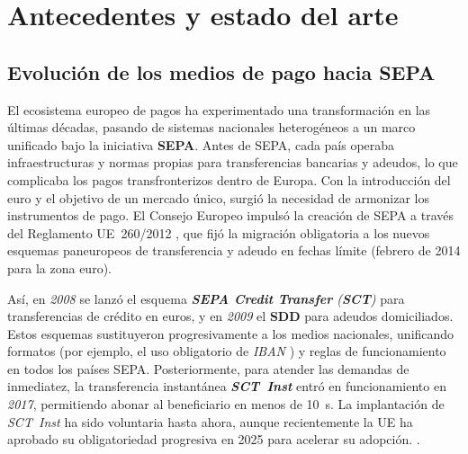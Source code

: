 
\chapter{Antecedentes y estado del arte}
\label{sec:estado-arte}

\section{Evolución de los medios de pago hacia SEPA}
\label{subsec:evolucion-sepa}


El ecosistema europeo de pagos ha experimentado una transformación en las últimas décadas, pasando de sistemas nacionales heterogéneos a un marco unificado bajo la iniciativa \textbf{SEPA}. Antes de SEPA, cada país operaba infraestructuras y normas propias para transferencias bancarias y adeudos, lo que complicaba los pagos transfronterizos dentro de Europa.  
Con la introducción del euro y el objetivo de un mercado único, surgió la necesidad de armonizar los instrumentos de pago. El Consejo Europeo impulsó la creación de SEPA a través del Reglamento UE~\num{260}/\num{2012} \cite{eu_260_2012}, que fijó la migración obligatoria a los nuevos esquemas paneuropeos de transferencia y adeudo en fechas límite (febrero de 2014 para la zona euro).  
\vspace{0.5cm}

Así, en \textit{2008} se lanzó el esquema \textit{\textbf{SEPA Credit Transfer} (\textbf{SCT})} \cite{epc125_2023} para transferencias de crédito en euros, y en \textit{2009} el \textbf{SDD} para adeudos domiciliados. Estos esquemas sustituyeron progresivamente a los medios nacionales, unificando formatos (por ejemplo, el uso obligatorio de \emph{IBAN} \cite{EU_IBAN_2001}) y reglas de funcionamiento en todos los países SEPA. Posteriormente, para atender las demandas de inmediatez, la transferencia instantánea \textit{\textbf{SCT~Inst}} entró en funcionamiento en \textit{2017}, permitiendo abonar al beneficiario en menos de \SI{10}{\second}. La implantación de \textit{SCT~Inst} ha sido voluntaria hasta ahora, aunque recientemente la UE ha aprobado su obligatoriedad progresiva en 2025 para acelerar su adopción. \cite{EBA_RT1}.
\vspace{0.5cm}

